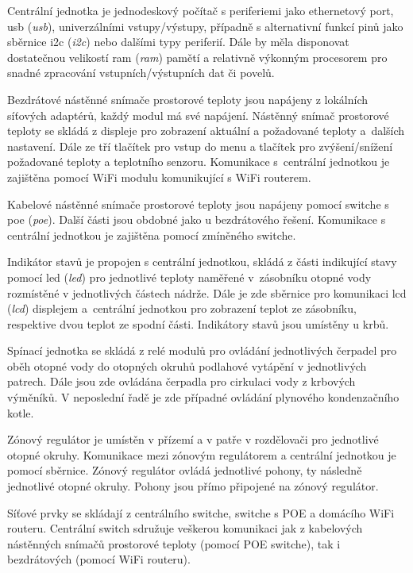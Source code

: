 Centrální jednotka je jednodeskový počítač s periferiemi jako ethernetový port, \acrshort{usb} (\textit{\acrlong{usb}}), univerzálními vstupy/výstupy, případně s alternativní funkcí pinů jako sběrnice \acrshort{i2c} (\textit{\acrlong{i2c}}) nebo dalšími typy periferií. Dále by měla disponovat dostatečnou velikostí \acrshort{ram} (\textit{\acrlong{ram}}) pamětí a relativně výkonným procesorem pro snadné zpracování vstupních/výstupních dat či povelů.

Bezdrátové nástěnné snímače prostorové teploty jsou napájeny z lokálních síťových adaptérů, každý modul má své napájení. Nástěnný snímač prostorové teploty se skládá z displeje pro zobrazení aktuální a požadované teploty a~dalších nastavení. Dále ze tří tlačítek pro vstup do menu a tlačítek pro zvýšení/snížení požadované teploty a teplotního senzoru. Komunikace s~centrální jednotkou je zajištěna pomocí WiFi modulu komunikující s WiFi routerem.

Kabelové nástěnné snímače prostorové teploty jsou napájeny pomocí switche s  \acrshort{poe} (\textit{\acrlong{poe}}). Další části jsou obdobné jako u bezdrátového řešení. Komunikace s centrální jednotkou je zajištěna pomocí zmíněného switche.

Indikátor stavů je propojen s centrální jednotkou, skládá z části indikující stavy pomocí \acrshort{led} (\textit{\acrlong{led}}) pro jednotlivé teploty naměřené v~zásobníku otopné vody rozmístěné v jednotlivých částech nádrže. Dále je zde sběrnice pro komunikaci \acrshort{lcd} (\textit{\acrlong{lcd}}) displejem a~centrální jednotkou pro zobrazení teplot ze zásobníku, respektive dvou teplot ze spodní části. Indikátory stavů jsou umístěny u krbů.

Spínací jednotka se skládá z relé modulů pro ovládání jednotlivých čerpadel pro oběh otopné vody do otopných okruhů podlahové vytápění v jednotlivých patrech. Dále jsou zde ovládána čerpadla pro cirkulaci vody z krbových výměníků. V neposlední řadě je zde případné ovládání plynového kondenzačního kotle.

Zónový regulátor je umístěn v přízemí a v patře v rozdělovači pro jednotlivé otopné okruhy. Komunikace mezi zónovým regulátorem a centrální jednotkou je pomocí sběrnice. Zónový regulátor ovládá jednotlivé pohony, ty následně jednotlivé otopné okruhy. Pohony jsou přímo připojené na zónový regulátor.

Síťové prvky se skládají z centrálního switche, switche s POE a domácího WiFi routeru. Centrální switch sdružuje veškerou komunikaci jak z kabelových nástěnných snímačů prostorové teploty (pomocí POE switche), tak i bezdrátových (pomocí WiFi routeru). 

